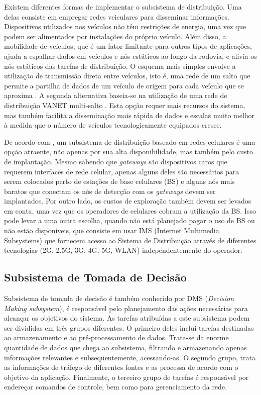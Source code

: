 \documentclass[
	12pt,				%
	oneside,			%
	a4paper,			%
	english,			%
	brazil				%
	]{abntex2ppgsi}
\begin{document}
Existem diferentes formas de implementar o subsistema de distribuição. Uma delas consiste em empregar redes veiculares para disseminar informações. Dispositivos utilizados nos veículos não têm restrições de energia, uma vez que podem ser alimentados por instalações do próprio veículo. Além disso, a mobilidade de veículos, que é um fator limitante para outros tipos de aplicações, ajuda a espalhar dados em veículos e nós estáticos ao longo da rodovia, e alivia os nós estáticos das tarefas de distribuição. O esquema mais simples envolve a utilização de transmissão direta entre veículos, isto é, uma rede de um salto que permite a partilha de dados de um veículo de origem para cada veículo que se aproxima \cite{li2007snms} \cite{miura2006evaluation}. A segunda alternativa baseia-se na utilização de uma rede de distribuição VANET multi-salto \cite{qin2010integrated}. Esta opção requer mais recursos do sistema, mas também facilita a disseminação mais rápida de dados e escalas muito melhor à medida que o número de veículos tecnologicamente equipados cresce.

De acordo com , um subsistema de distribuição baseado em redes celulares é uma opção atraente, não apenas por sua alta disponibilidade, mas também pelo custo de implantação. Mesmo sabendo que \textit{gateways} são dispositivos caros que requerem interfaces de rede celular, apenas alguns deles são necessários para serem colocados perto de estações de base celulares (BS) e alguns nós mais baratos que conectam os nós de detecção com os \textit{gateways} devem ser implantados. Por outro lado, os custos de exploração também devem ser levados em conta, uma vez que os operadores de celulares cobram a utilização da BS. Isso pode levar a uma outra escolha, quando não está planejado pagar o uso de BS ou não estão disponíveis, que consiste em usar IMS (Internet Multimedia Subsystems) \cite{birk2009iroad} que fornecem acesso ao Sistema de Distribuição através de diferentes tecnologias (2G, 2.5G, 3G, 4G, 5G, WLAN) independentemente do operador.

\subsection{Subsistema de Tomada de Decisão}

Subsistema de tomada de decisão é também conhecido por DMS (\textit{Decision Making subsystem}), é responsável pelo planejamento das ações necessárias para alcançar os objetivos do sistema. As tarefas atribuídas a este subsistema podem ser divididas em três grupos diferentes. O primeiro deles inclui tarefas destinadas ao armazenamento e ao pré-processamento de dados. Trata-se da enorme quantidade de dados que chega ao subsistema, filtrando e armazenando apenas informações relevantes e subseqüentemente, acessando-as. O segundo grupo, trata as informações de tráfego de diferentes fontes e as processa de acordo com o objetivo da aplicação. Finalmente, o terceiro grupo de tarefas é responsável por endereçar comandos de controle, bem como para gerenciamento da rede.
\end{document}
